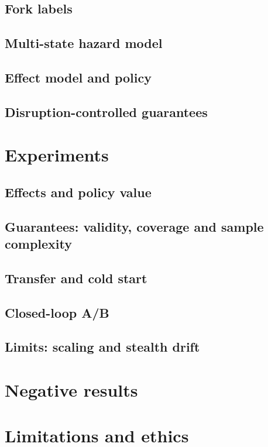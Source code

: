 \documentclass[11pt]{article}
\begin{document}
\subsection{Fork labels}
\subsection{Multi-state hazard model}
\subsection{Effect model and policy}
\subsection{Disruption-controlled guarantees}

\section{Experiments}
\subsection{Effects and policy value}
\subsection{Guarantees: validity, coverage and sample complexity}
\subsection{Transfer and cold start}
\subsection{Closed-loop A/B}
\subsection{Limits: scaling and stealth drift}

\section{Negative results}

\section{Limitations and ethics}
\end{document}
